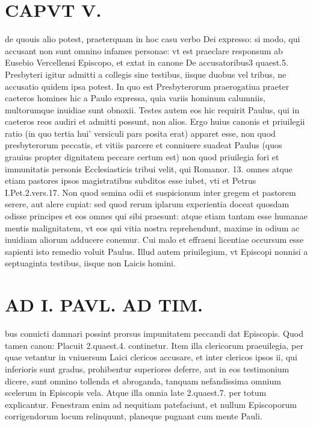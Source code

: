 \documentclass{article}
\begin{document}
\begin{pages}
\section*{CAPVT V. }
\marginpar{[ p.315 ]}\pstart de quouis alio potest, praeterquam in hoc casu verbo Dei expresso: si modo, qui accusant non sunt omnino infames personae: vt est praeclare responsum ab Eusebio Vercellensi Episcopo, et extat in canone De accusatoribus3 quaest.5. Presbyteri igitur admitti a collegis sine testibus, iisque duobus vel tribus, ne accusatio quidem ipsa potest. In quo est Presbyterorum praerogatiua praeter caeteros homines hic a Paulo expressa, quia variis hominum calumniis, multorumque inuidiae sunt obnoxii.  \pend\pstart Testes autem eos hic requirit Paulus, qui in caeteros reos audiri et admitti possunt, non alios. Ergo huius canonis et priuilegii ratio (in quo tertia hui' versiculi pars posita erat) apparet esse, non quod presbyterorum peccatis, et vitiis parcere et conniuere suadeat Paulus (quos grauius propter dignitatem peccare certum est) non quod priuilegia fori et immunitatis personis Ecclesiasticis tribui velit, qui Romanor. 13. omnes atque etiam pastores ipsos magistratibus subditos esse iubet, vti et Petrus I.Pet.2.vers.17. Non quod semina odii et suspicionum inter gregem et pastorem serere, aut alere cupiat: sed quod rerum iplarum experientia doceat quosdam odisse principes et eos omnes qui sibi praesunt: atque etiam tantam esse humanae mentis malignitatem, vt eos qui vitia nostra reprehendunt, maxime in odium ac inuidiam aliorum adducere conemur. Cui malo et effraeni licentiae occursum esse sapienti isto remedio voluit Paulus.  \pend\pstart Illud autem priuilegium, vt Episcopi nonnisi a septuaginta testibus, iisque non Laicis homini.  \pend
\section*{AD I. PAVL. AD TIM. }
\marginpar{[ p.310 ]}\pstart bus conuicti damnari possint prorsus impunitatem peccandi dat Episcopis. Quod tamen canon: Placuit 2.quaest.4. continetur. Item illa clericorum praeuilegia, per quae vetantur in vniuersum Laici clericos accusare, et inter clericos ipsos ii, qui inferioris sunt gradus, prohibentur superiores deferre, aut in eos testimonium dicere, sunt omnino tollenda et abroganda, tanquam nefandissima omnium scelerum in Episcopis vela. Atque illa omnia late 2.quaest.7. per totum explicantur.  \pend\pstart Fenestram enim ad nequitiam patefaciunt, et nullum Episcoporum corrigendorum locum relinquunt, planeque pugnant cum mente Pauli.  \pend
{}
{}

\end{pages}
\end{document}
